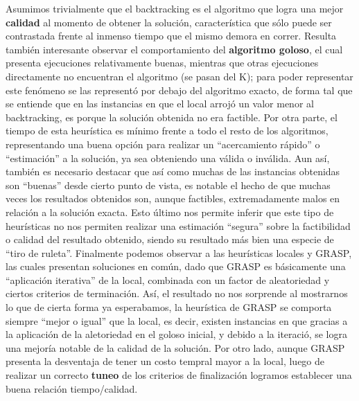   Asumimos trivialmente que el backtracking es el algoritmo que logra una mejor \textbf{calidad} al momento de obtener la solución, característica que sólo puede ser contrastada frente al inmenso tiempo que el mismo demora en correr. Resulta también interesante observar el comportamiento del \textbf{algoritmo goloso}, el cual presenta ejecuciones relativamente buenas, mientras que otras ejecuciones directamente no encuentran el algoritmo (se pasan del K); para poder representar este fenómeno se las representó por debajo del algoritmo exacto, de forma tal que se entiende que en las instancias en que el local arrojó un valor menor al backtracking, es porque la solución obtenida no era factible. Por otra parte, el tiempo de esta heurística es mínimo frente a todo el resto de los algoritmos, representando una buena opción para realizar un ``acercamiento rápido'' o ``estimación'' a la solución, ya sea obteniendo una válida o inválida. Aun así, también es necesario destacar que así como muchas de las instancias obtenidas son ``buenas'' desde cierto punto de vista, es notable el hecho de que muchas veces los resultados obtenidos son, aunque factibles, extremadamente malos en relación a la solución exacta. Esto último nos permite inferir que este tipo de heurísticas no nos permiten realizar una estimación ``segura'' sobre la factibilidad o calidad del resultado obtenido, siendo su resultado más bien una especie de ``tiro de ruleta''. Finalmente podemos observar a las heurísticas locales y GRASP, las cuales presentan soluciones en común, dado que GRASP es básicamente una ``aplicación iterativa'' de la local, combinada con un factor de aleatoriedad y ciertos criterios de terminación. Así, el resultado no nos sorprende al mostrarnos lo que de cierta forma ya esperabamos, la heurística de GRASP se comporta siempre ``mejor o igual'' que la local, es decir, existen instancias en que gracias a la aplicación de la aletoriedad en el goloso inicial, y debido a la iteració, se logra una mejoría notable de la calidad de la solución. Por otro lado, aunque GRASP presenta la desventaja de tener un costo tempral mayor a la local, luego de realizar un correcto \textbf{tuneo} de los criterios de finalización logramos establecer una buena relación tiempo/calidad.
